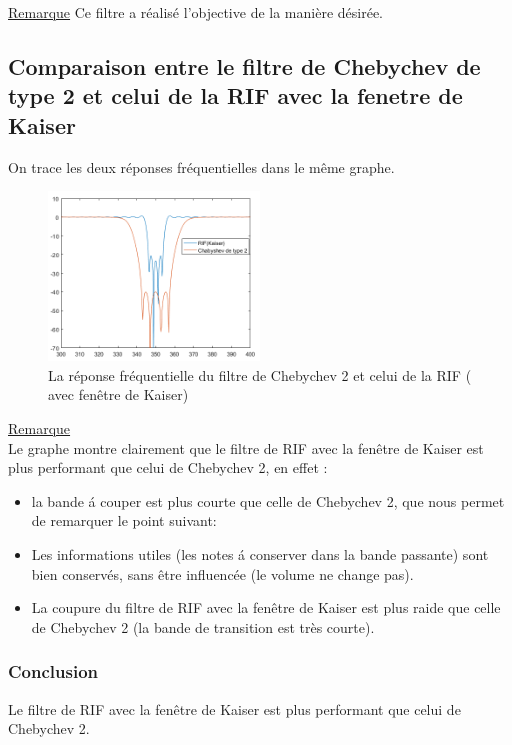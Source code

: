 \documentclass[twoside,twocolumn]{article}
\begin{document}
\underline{Remarque}
Ce filtre a réalisé l'objective de la manière désirée.

\subsection{Comparaison entre le filtre de Chebychev de type 2 et celui de la RIF avec la fenetre de Kaiser}
On trace les deux réponses fréquentielles dans le même graphe.
 
\begin{figure}[H]
\centering
\includegraphics[width=0.5\textwidth]{Images/21.png}
\caption{ La réponse fréquentielle du filtre de Chebychev 2 et celui de la RIF ( avec fenêtre de Kaiser)}
\end{figure} 

\underline{Remarque}\\
Le graphe montre clairement que le filtre de RIF avec la fenêtre de Kaiser est plus performant que celui de Chebychev 2, en effet :
\begin{itemize}
\item
la bande á couper est plus courte que celle de Chebychev 2, que nous permet de remarquer le point suivant:
\item
Les informations utiles (les notes á conserver dans la bande passante) sont bien conservés, sans être influencée (le volume ne change pas).
\item
La coupure du filtre de RIF avec la fenêtre de Kaiser est plus raide que celle de Chebychev 2 (la bande de transition est très courte).
\end{itemize}

\subsubsection{Conclusion}
Le filtre de RIF avec la fenêtre de Kaiser est plus performant que celui de Chebychev 2.
\end{document}

